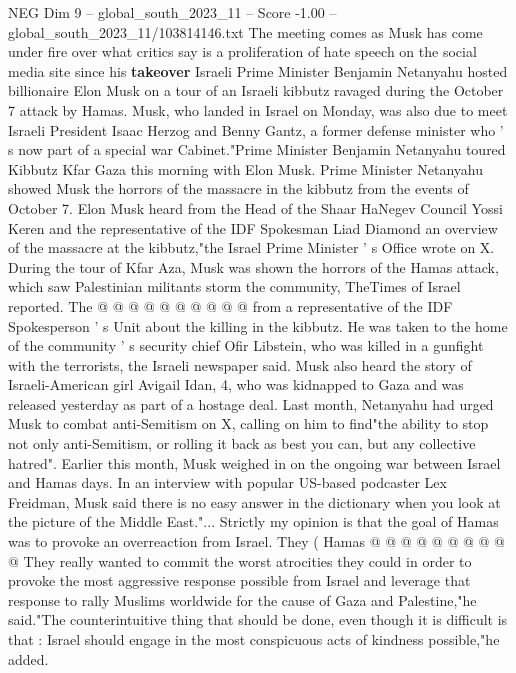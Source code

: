 \begin{textsample}{NEG Dim 9 – global\_south\_2023\_11 – Score -1.00 – global\_south\_2023\_11/103814146.txt}  \label{ex:f9_neg_435}
The meeting comes as Musk has come under fire over what critics say is a proliferation of hate speech on the social media site since his \textbf{takeover} Israeli Prime Minister Benjamin Netanyahu hosted billionaire Elon Musk on a tour of an Israeli kibbutz ravaged during the October 7 attack by Hamas.
Musk, who landed in Israel on Monday, was also due to meet Israeli President Isaac Herzog and Benny Gantz, a former defense minister who ' s now part of a special war Cabinet."Prime Minister Benjamin Netanyahu toured Kibbutz Kfar Gaza this morning with Elon Musk.
Prime Minister Netanyahu showed Musk the horrors of the massacre in the kibbutz from the events of October 7.
Elon Musk heard from the Head of the Shaar HaNegev Council Yossi Keren and the representative of the IDF Spokesman Liad Diamond an overview of the massacre at the kibbutz,"the Israel Prime Minister ' s Office wrote on X.
During the tour of Kfar Aza, Musk was shown the horrors of the Hamas attack, which saw Palestinian militants storm the community, TheTimes of Israel reported.
The @ @ @ @ @ @ @ @ @ @ from a representative of the IDF Spokesperson ' s Unit about the killing in the kibbutz.
He was taken to the home of the community ' s security chief Ofir Libstein, who was killed in a gunfight with the terrorists, the Israeli newspaper said.
Musk also heard the story of Israeli-American girl Avigail Idan, 4, who was kidnapped to Gaza and was released yesterday as part of a hostage deal.
Last month, Netanyahu had urged Musk to combat anti-Semitism on X, calling on him to find"the ability to stop not only anti-Semitism, or rolling it back as best you can, but any collective hatred".
Earlier this month, Musk weighed in on the ongoing war between Israel and Hamas days.
In an interview with popular US-based podcaster Lex Freidman, Musk said there is no easy answer in the dictionary when you look at the picture of the Middle East."...
Strictly my opinion is that the goal of Hamas was to provoke an overreaction from Israel.
They ( Hamas @ @ @ @ @ @ @ @ @ @ They really wanted to commit the worst atrocities they could in order to provoke the most aggressive response possible from Israel and leverage that response to rally Muslims worldwide for the cause of Gaza and Palestine,"he said."The counterintuitive thing that should be done, even though it is difficult is that : Israel should engage in the most conspicuous acts of kindness possible,"he added.

\end{textsample}
